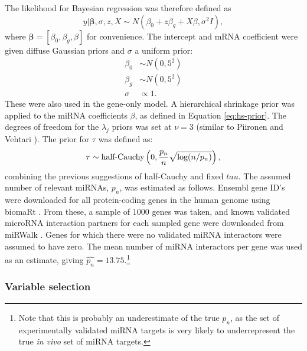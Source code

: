 The likelihood for Bayesian regression was therefore defined as
\begin{equation}
	y | \mathbf{\beta}, \sigma, z, X \sim N(\beta_0 + z \beta_g + X \beta, \sigma^2I),
\end{equation}
where $\mathbf{\beta} = [\beta_0, \beta_g, \beta]$ for convenience.
The intercept and mRNA coefficient were given diffuse Gaussian priors
and $\sigma$ a uniform prior:
\begin{subequations}
  \begin{align}
    \beta_0 & \sim N(0, 5^2) \\
    \beta_g & \sim N(0, 5^2) \\
    \sigma  & \propto 1.
  \end{align}
\end{subequations}
These were also used in the gene-only model.
A hierarchical shrinkage prior was applied to the miRNA coefficients $\beta$,
as defined in Equation \eqref{eq:hs-prior}. The degrees of freedom for the
$\lambda_j$ priors was set at $\nu=3$ (similar to Piironen and Vehtari
\citep{Piironen2015}). The prior for $\tau$ was defined as:
\begin{equation}
    \tau \sim \textup{half-Cauchy} \left ( 0, \frac{p_n}{n}\sqrt{\textup{log}(n/p_n)} \right ),
\end{equation}
combining the previous suggestions of half-Cauchy and fixed $tau$.
The assumed number of relevant miRNAs, $p_n$, was estimated as follows.
Ensembl gene ID's were downloaded for all protein-coding genes in the human
genome using biomaRt \citep{biomaRt}. From these, a sample of 1000 genes was
taken, and known validated microRNA interaction partners for each sampled gene
were downloaded from miRWalk \citep{Dweep2015}. Genes for which there were no
validated miRNA interactors were assumed to have zero. The mean number of
miRNA interactors per gene was used as an estimate, giving
$\hat{p_n} = 13.75$.\footnote{Note that this is probably an underestimate of
the true $p_n$, as the set of experimentally validated miRNA targets is
very likely to underrepresent the true \emph{in vivo} set of miRNA targets.}



\subsubsection{Variable selection}

